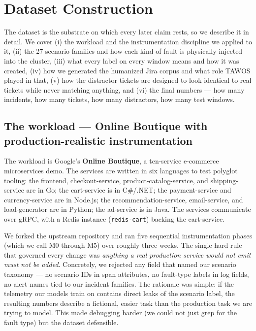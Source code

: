 \section{Dataset Construction}
\label{sec:dataset}

The dataset is the substrate on which every later claim rests, so we describe it in detail. We cover (i) the workload and the instrumentation discipline we applied to it, (ii) the 27 scenario families and how each kind of fault is physically injected into the cluster, (iii) what every label on every window means and how it was created, (iv) how we generated the humanized Jira corpus and what role TAWOS played in that, (v) how the distractor tickets are designed to look identical to real tickets while never matching anything, and (vi) the final numbers --- how many incidents, how many tickets, how many distractors, how many test windows.

\subsection{The workload --- Online Boutique with production-realistic instrumentation}

The workload is Google's \textbf{Online Boutique}, a ten-service e-commerce microservices demo. The services are written in six languages to test polyglot tooling: the frontend, checkout-service, product-catalog-service, and shipping-service are in Go; the cart-service is in C\#/.NET; the payment-service and currency-service are in Node.js; the recommendation-service, email-service, and load-generator are in Python; the ad-service is in Java. The services communicate over gRPC, with a Redis instance (\texttt{redis-cart}) backing the cart-service.

We forked the upstream repository and ran five sequential instrumentation phases (which we call M0 through M5) over roughly three weeks. The single hard rule that governed every change was \emph{anything a real production service would not emit must not be added}. Concretely, we rejected any field that named our scenario taxonomy --- no scenario IDs in span attributes, no fault-type labels in log fields, no alert names tied to our incident families. The rationale was simple: if the telemetry our models train on contains direct leaks of the scenario label, the resulting numbers describe a fictional, easier task than the production task we are trying to model. This made debugging harder (we could not just grep for the fault type) but the dataset defensible.


